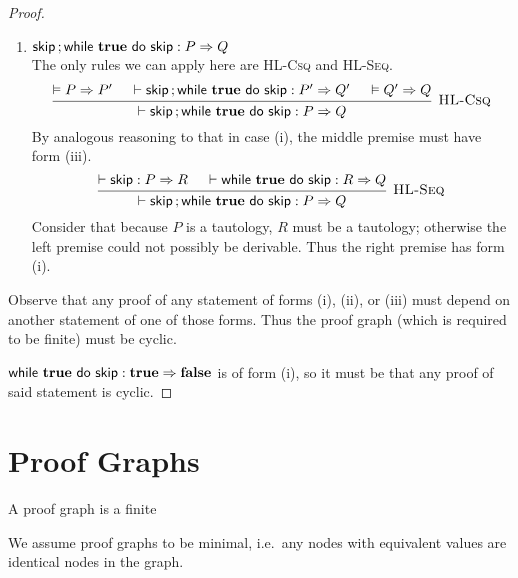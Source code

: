 \begin{proof}
\begin{enumerate}[label=(\roman*)]
\item $\Triple {\Seq \Skip ; {\While {\True} do {\Skip}} } : P => Q$ \\
    The only rules we can apply here are \textsc{HL-Csq} and \textsc{HL-Seq}.
%
    \[\begin{prooftree}
        \hypo{\VAL P \Rightarrow P'}
        \hypo{\DER \Triple {\Seq \Skip ; {\While {\True} do {\Skip}} } : P' => Q'}
        \hypo{\VAL Q' \Rightarrow Q}
        \infer3[\textsc{HL-Csq}] 
            {\DER \Triple {\Seq \Skip ; {\While {\True} do {\Skip}} } : P => Q}
    \end{prooftree}\]
%
    By analogous reasoning to that in case (i),
    the middle premise must have form (iii).
    \[\begin{prooftree}
        \hypo{\DER \Triple \Skip : P => R}
        \hypo{\DER \Triple {\While {\True} do {\Skip} } : R => Q}
        \infer2[\textsc{HL-Seq}] 
            {\DER \Triple {\Seq \Skip ; {\While {\True} do {\Skip}} } : P => Q}
    \end{prooftree}\]
%
    Consider that because $P$ is a tautology, $R$ must be a tautology; 
    otherwise the left premise could not possibly be derivable.
    Thus the right premise has form (i).
    
\end{enumerate}

Observe that any proof of any statement of forms (i), (ii), or (iii)
must depend on another statement of one of those forms.
Thus the proof graph (which is required to be finite) must be cyclic.

$\Triple {\While {\True} do {\Skip} } : \True => \False$ is of form (i),
so it must be that any proof of said statement is cyclic.

\end{proof}



\section{Proof Graphs}

\begin{definition}
    A proof graph is a finite 

    We assume proof graphs to be minimal, i.e.\ any nodes with equivalent values
    are identical nodes in the graph.
\end{definition}

